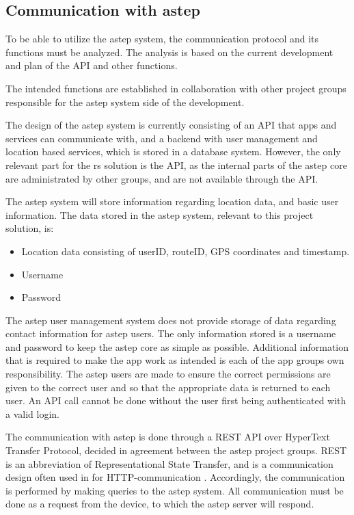 \subsection{Communication with \gls{astep}}\label{ssec:communicationwithastep}
To be able to utilize the \gls{astep} system, the communication protocol and its functions must be analyzed. 
The analysis is based on the current development and plan of the API and other functions.

The intended functions are established in collaboration with other project groups responsible for the \gls{astep} system side of the development. 

The design of the \gls{astep} system is currently consisting of an API that apps and services can communicate with, and a backend with user management and location based services, which is stored in a database system.
However, the only relevant part for the \gls{rs} solution is the API, as the internal parts of the \gls{astep} core are administrated by other groups, and are not available through the API.

The \gls{astep} system will store information regarding location data, and basic user information. 
The data stored in the \gls{astep} system, relevant to this project solution, is:
\begin{itemize}
	\item Location data consisting of userID, routeID, GPS coordinates and timestamp.
	\item Username
	\item Password
\end{itemize}

The \gls{astep} user management system does not provide storage of data regarding contact information for \gls{astep} users.
The only information stored is a username and password to keep the \gls{astep} core as simple as possible.
Additional information that is required to make the app work as intended is each of the app groups own responsibility.
The \gls{astep} users are made to ensure the correct permissions are given to the correct user and so that the appropriate data is returned to each user.
An API call cannot be done without the user first being authenticated with a valid login.

The communication with \gls{astep} is done through a REST API over HyperText Transfer Protocol, decided in agreement between the \gls{astep} project groups.
REST is an abbreviation of Representational State Transfer, and is a communication design often used in for HTTP-communication \cite{REST}.
Accordingly, the communication is performed by making queries to the \gls{astep} system. 
All communication must be done as a request from the device, to which the \gls{astep} server will respond.

